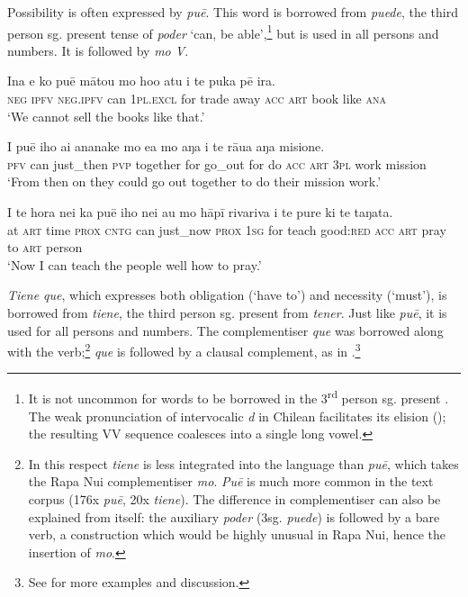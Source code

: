 Possibility is often expressed by \textit{puē}. This word is borrowed from  \textit{puede}, the third person sg. present tense of \textit{poder} ‘can, be able’,\footnote{\label{fn:508}It is not uncommon for  words to be borrowed in the 3\textsuperscript{rd} person sg. present \citep[197]{Makihara2001Adaptation}. The weak pronunciation of intervocalic \textit{d} in Chilean  facilitates its elision (); the resulting VV sequence coalesces into a single long vowel.} but is used in all persons and numbers. It is followed by \textit{mo V}.

\ea\label{ex:11.82}
\gll {\ꞌ}Ina e ko puē mātou mo ho{\ꞌ}o atu i te puka pē ira.  \\
\textsc{neg} \textsc{ipfv} \textsc{neg.ipfv} can \textsc{1pl.excl} for trade away \textsc{acc} \textsc{art} book like \textsc{ana}  \\

\glt 
‘We cannot sell the books like that.’ \textstyleExampleref{[R206.021]} 
\z

\ea\label{ex:11.83}
\gll I puē iho ai ananake mo e{\ꞌ}a mo aŋa i te rāua aŋa misione. \\
\textsc{pfv} can just\_then \textsc{pvp} together for go\_out for do \textsc{acc} \textsc{art} \textsc{3pl} work mission \\

\glt 
‘From then on they could go out together to do their mission work.’ \textstyleExampleref{[R231.281]} 
\z

\ea\label{ex:11.84}
\gll {\ꞌ}I te hora nei ka puē iho nei au mo hāpī rivariva i te pure  ki te taŋata.\\
at \textsc{art} time \textsc{prox} \textsc{cntg} can just\_now \textsc{prox} \textsc{1sg} for teach good:\textsc{red} \textsc{acc} \textsc{art} pray  to \textsc{art} person\\

\glt 
‘Now I can teach the people well how to pray.’ \textstyleExampleref{[R231.195]} 
\z

\textit{Tiene que}, which expresses both obligation (‘have to’) and necessity (‘must’), is borrowed from  \textit{tiene}, the third person sg. present from \textit{tener}. Just like \textit{puē}, it is used for all persons and numbers. The complementiser \textit{que} was borrowed along with the verb;\footnote{\label{fn:509}In this respect \textit{tiene} is less integrated into the language than \textit{puē}, which takes the Rapa Nui complementiser \textit{mo}. \textit{Puē} is much more common in the text corpus (176x \textit{puē}, 20x \textit{tiene}). The difference in complementiser can also be explained from  itself: the auxiliary \textit{poder} (3sg. \textit{puede}) is followed by a bare verb, a construction which would be highly unusual in Rapa Nui, hence the insertion of \textit{mo}.} \textit{que} is followed by a clausal complement, as in .\footnote{\label{fn:510}See \citet[207–210]{Makihara2001Adaptation} for more examples and discussion.}

